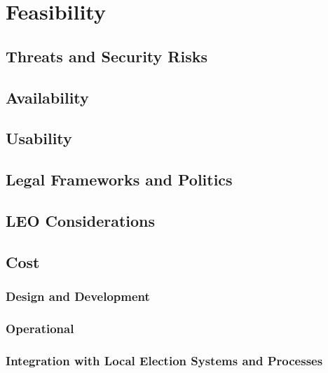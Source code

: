 \chapter{Feasibility}
\label{chapter:feasibility}

\section{Threats and Security Risks}
\section{Availability}
\section{Usability}
\section{Legal Frameworks and Politics}
\section{LEO Considerations}
\section{Cost}
\subsection{Design and Development}
\subsection{Operational}
\subsection{Integration with Local Election Systems and Processes}